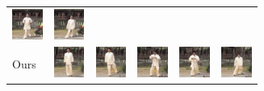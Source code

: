 \documentclass{article}
\begin{document}
\begin{table}[t]
\begin{center}
\begin{small}
\begin{sc}
\begin{tabular}{m{1.0cm}m{1.0cm}m{1.0cm}m{1.0cm}m{1.0cm}m{1.0cm}}
\includegraphics[width=1cm, height=1cm]{images/intro_image/animate_5_fomm.png} &
\includegraphics[width=1cm, height=1cm]{images/intro_image/animate_6_fomm.png} \\
Ours & \includegraphics[width=1cm, height=1cm]{images/intro_image/animate_1.png} &
\includegraphics[width=1cm, height=1cm]{images/intro_image/animate_2.png} &
\includegraphics[width=1cm, height=1cm]{images/intro_image/animate_4.png} &
\includegraphics[width=1cm, height=1cm]{images/intro_image/animate_5.png} &
\includegraphics[width=1cm, height=1cm]{images/intro_image/animate_6.png} \\
\bottomrule
\end{tabular}
\end{sc}
\end{small}
\end{center}
\vskip -0.1in
\end{table}
\end{document}
